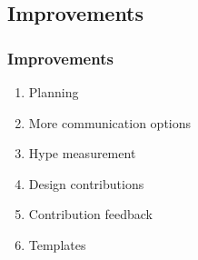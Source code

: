 \subsection{Improvements}
\begin{frame}\frametitle{Improvements}
    \begin{enumerate}
        \item Planning
        \item More communication options
        \item Hype measurement
        \item Design contributions
        \item Contribution feedback
        \item Templates
    \end{enumerate}
\end{frame}